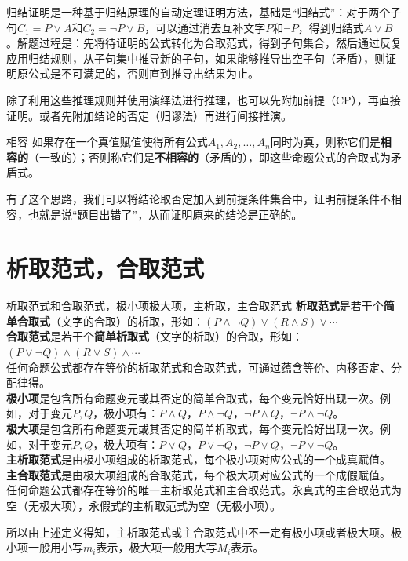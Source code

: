归结证明是一种基于归结原理的自动定理证明方法，基础是“归结式”：对于两个子句$C_1 = P \lor A$和$C_2 = \neg P \lor B$，可以通过消去互补文字$P$和$\neg P$，得到归结式$A \lor B$。解题过程是：先将待证明的公式转化为合取范式，得到子句集合，然后通过反复应用归结规则，从子句集中推导新的子句，如果能够推导出空子句（矛盾），则证明原公式是不可满足的，否则直到推导出结果为止。

除了利用这些推理规则并使用演绎法进行推理，也可以先附加前提（CP），再直接证明。或者先附加结论的否定（归谬法）再进行间接推演。
\begin{definition}{相容}{}
    如果存在一个真值赋值使得所有公式$A_1, A_2, \ldots, A_n$同时为真，则称它们是\textbf{相容的}（一致的）；否则称它们是\textbf{不相容的}（矛盾的），即这些命题公式的合取式为矛盾式。
\end{definition}
有了这个思路，我们可以将结论取否定加入到前提条件集合中，证明前提条件不相容，也就是说“题目出错了”，从而证明原来的结论是正确的。
\section{析取范式，合取范式}
\begin{definition}{析取范式和合取范式，极小项极大项，主析取，主合取范式}{}
\textbf{析取范式}是若干个\textbf{简单合取式}（文字的合取）的析取，形如：$(P \land \neg Q) \lor (R \land S) \lor \cdots$\\
\textbf{合取范式}是若干个\textbf{简单析取式}（文字的析取）的合取，形如：$(P \lor \neg Q) \land (R \lor S) \land \cdots$\\
任何命题公式都存在等价的析取范式和合取范式，可通过蕴含等价、内移否定、分配律得。\\
\textbf{极小项}是包含所有命题变元或其否定的简单合取式，每个变元恰好出现一次。例如，对于变元$P,Q$，极小项有：$P \land Q$，$P \land \neg Q$，$\neg P \land Q$，$\neg P \land \neg Q$。\\
\textbf{极大项}是包含所有命题变元或其否定的简单析取式，每个变元恰好出现一次。例如，对于变元$P,Q$，极大项有：$P \lor Q$，$P \lor \neg Q$，$\neg P \lor Q$，$\neg P \lor \neg Q$。\\
\textbf{主析取范式}是由极小项组成的析取范式，每个极小项对应公式的一个成真赋值。\\
\textbf{主合取范式}是由极大项组成的合取范式，每个极大项对应公式的一个成假赋值。\\
任何命题公式都存在等价的唯一主析取范式和主合取范式。永真式的主合取范式为空（无极大项），永假式的主析取范式为空（无极小项）。
\end{definition}
所以由上述定义得知，主析取范式或主合取范式中不一定有极小项或者极大项。极小项一般用小写$m_i$表示，极大项一般用大写$M_i$表示。

